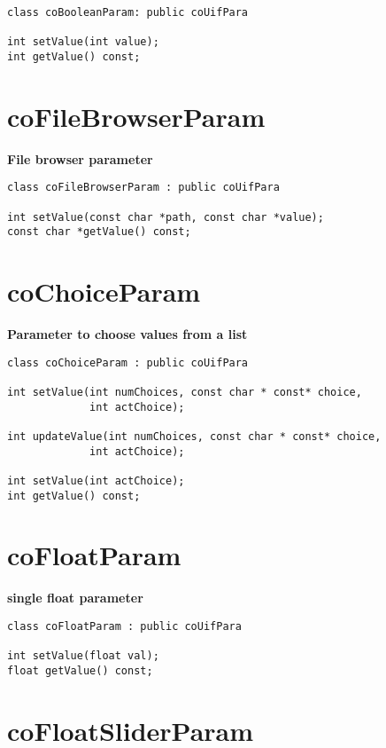 \begin{verbatim}
class coBooleanParam: public coUifPara
 
int setValue(int value);
int getValue() const;
\end{verbatim}

 

\section{coFileBrowserParam}

{\bf File browser parameter}

\begin{verbatim}
class coFileBrowserParam : public coUifPara
 
int setValue(const char *path, const char *value);
const char *getValue() const;
\end{verbatim}

 

\section{coChoiceParam}

{\bf Parameter to choose values from a list}

\begin{verbatim}
class coChoiceParam : public coUifPara

int setValue(int numChoices, const char * const* choice, 
             int actChoice);

int updateValue(int numChoices, const char * const* choice, 
             int actChoice);
	     
int setValue(int actChoice);
int getValue() const;
\end{verbatim}


\section{coFloatParam}

{\bf single float parameter}

\begin{verbatim}
class coFloatParam : public coUifPara

int setValue(float val);
float getValue() const;
\end{verbatim}
 

\section{coFloatSliderParam}

